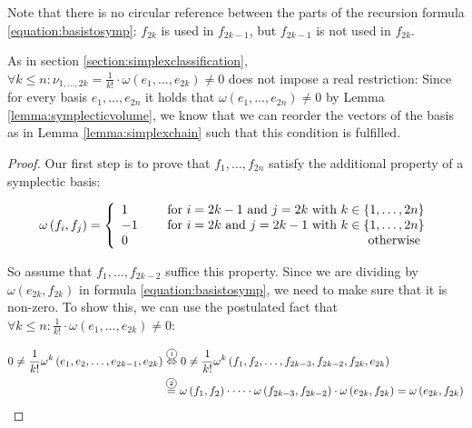 \documentclass[../SymplecticSimplices.tex]{subfiles}
\begin{document}
Note that there is no circular reference between the parts of the recursion formula \eqref{equation:basistosymp}: \( f_{2k} \) is used in \( f_{2k-1} \), but \( f_{2k-1} \) is not used in \( f_{2k} \).

As in section \ref{section:simplexclassification}, \( \forall k \leq n : \nu_{1,\dots,2k } = \frac{1}{k!} \cdot \omega \left( e_1, \dots, e_{2k} \right) \neq 0 \) does not impose a real restriction: Since for every basis \( e_1, \dots, e_{2n} \) it holds that \( \omega \left( e_1, \dots, e_{2n} \right) \neq 0 \) by Lemma \ref{lemma:symplecticvolume}, we know that we can reorder the vectors of the basis as in Lemma \ref{lemma:simplexchain} such that this condition is fulfilled. 

\begin{proof}
  Our first step is to prove that \( f_1, \dots, f_{2n} \) satisfy the additional property of a symplectic basis:

\begin{align*}
  \omega \left( f_i, f_j \right) =
  \left\lbrace
  \begin{array}{llr}
    1 && \textnormal{ for } i = 2k - 1 \textnormal{ and } j = 2k \textnormal{ with } k \in \left\lbrace 1, \dots, 2n \right\rbrace \\
    -1 && \textnormal{ for } i = 2k \textnormal{ and } j = 2k - 1 \textnormal{ with } k \in \left\lbrace 1, \dots, 2n \right\rbrace \\
    0 && \textnormal{ otherwise }
  \end{array}
  \right.
\end{align*}
  
  So assume that \( f_{1}, \dots, f_{2k-2} \) suffice this property. Since we are dividing by \( \omega \left( e_{2k}, f_{2k} \right) \) in formula \eqref{equation:basistosymp}, we need to make sure that it is non-zero. To show this, we can use the postulated fact that \( \forall k \leq n : \frac{1}{k!} \cdot \omega \left( e_1, \dots, e_{2k} \right) \neq 0 \):

  \begin{equation*}
    \begin{split}
      0 \neq \frac{1}{k!} \omega^{k} \left( e_1, e_2, \dots, e_{2k-1}, e_{2k} \right) & \lracom{1} 0 \neq \frac{1}{k!} \omega^{k} \left( f_1, f_2, \dots, f_{2k-3}, f_{2k-2}, f_{2k}, e_{2k} \right) \\
                                                                                             & \eqcom{2} \omega \left( f_1, f_2 \right) \cdot \dots \cdot \omega \left( f_{2k-3}, f_{2k-2} \right) \cdot \omega \left( e_{2k}, f_{2k} \right) = \omega \left( e_{2k}, f_{2k} \right)
    \end{split}
  \end{equation*}


\end{proof}
\end{document}
